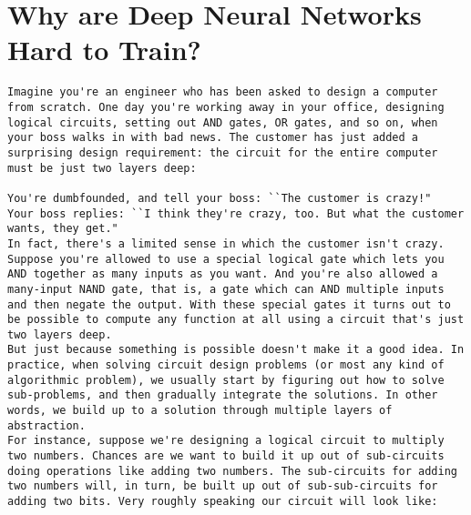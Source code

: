 \chapter{Why are Deep Neural Networks Hard to Train?}
\label{sec:WhyAreDeepNeuralNetworksHardToTrain?}





\begin{lstlisting}
Imagine you're an engineer who has been asked to design a computer from scratch. One day you're working away in your office, designing logical circuits, setting out AND gates, OR gates, and so on, when your boss walks in with bad news. The customer has just added a surprising design requirement: the circuit for the entire computer must be just two layers deep:

You're dumbfounded, and tell your boss: ``The customer is crazy!"
Your boss replies: ``I think they're crazy, too. But what the customer wants, they get."
In fact, there's a limited sense in which the customer isn't crazy. Suppose you're allowed to use a special logical gate which lets you AND together as many inputs as you want. And you're also allowed a many-input NAND gate, that is, a gate which can AND multiple inputs and then negate the output. With these special gates it turns out to be possible to compute any function at all using a circuit that's just two layers deep.
But just because something is possible doesn't make it a good idea. In practice, when solving circuit design problems (or most any kind of algorithmic problem), we usually start by figuring out how to solve sub-problems, and then gradually integrate the solutions. In other words, we build up to a solution through multiple layers of abstraction. 
For instance, suppose we're designing a logical circuit to multiply two numbers. Chances are we want to build it up out of sub-circuits doing operations like adding two numbers. The sub-circuits for adding two numbers will, in turn, be built up out of sub-sub-circuits for adding two bits. Very roughly speaking our circuit will look like:


\end{lstlisting}
